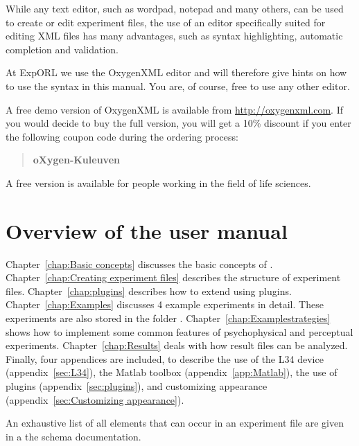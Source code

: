 While any text editor, such as wordpad, notepad and many others,
can be used to create or edit experiment files, the use of an
editor specifically suited for editing XML files has many
advantages, such as syntax highlighting, automatic completion and
validation.

At ExpORL we use the OxygenXML editor and will therefore give
hints on how to use the syntax in this manual. You are, of course,
free to use any other editor.

A free demo version of OxygenXML is available from
\url{http://oxygenxml.com}. If you would decide to buy the full
version, you will get a 10\% discount if you enter the following
coupon code during the ordering process:
\begin{quote}
    \textbf{oXygen-Kuleuven}
\end{quote}
\label{sec:XML editor}

A free version is available for people working in the field of
life sciences.

\section{Overview of the \apex user manual}

Chapter~\ref{chap:Basic concepts} discusses the basic concepts of
\apex. Chapter~\ref{chap:Creating experiment files} describes the
structure of experiment files. Chapter~\ref{chap:plugins} describes how to extend \apex using plugins. Chapter~\ref{chap:Examples}
discusses 4 example experiments in detail. These experiments are
also stored in the folder .
Chapter~\ref{chap:Examplestrategies} shows how to implement some
common features of psychophysical and perceptual experiments.
Chapter~\ref{chap:Results} deals with how \apex result files can
be analyzed. Finally, four appendices are included, to describe
the use of the L34 device (appendix~\ref{sec:L34}), the Matlab
toolbox (appendix~\ref{app:Matlab}), the use of plugins
(appendix~\ref{sec:plugins}), and customizing appearance
(appendix~\ref{sec:Customizing appearance}).

An exhaustive list of all elements that can occur in an \apex
experiment file are given in a the schema documentation.